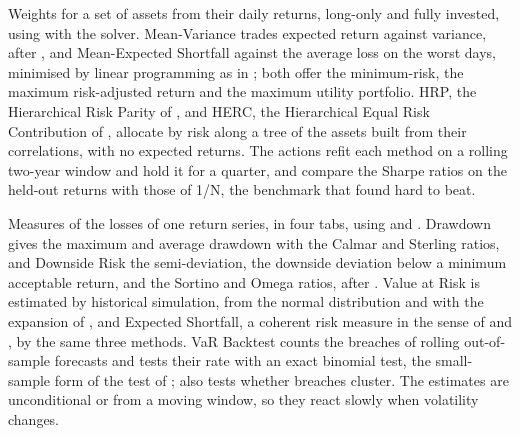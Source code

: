 Weights for a set of assets from their daily returns, long-only and fully invested, using  with the  solver. Mean-Variance trades expected return against variance, after , and Mean-Expected Shortfall against the average loss on the worst days, minimised by linear programming as in ; both offer the minimum-risk, the maximum risk-adjusted return and the maximum utility portfolio. HRP, the Hierarchical Risk Parity of , and HERC, the Hierarchical Equal Risk Contribution of , allocate by risk along a tree of the assets built from their correlations, with no expected returns. The actions refit each method on a rolling two-year window and hold it for a quarter, and compare the Sharpe ratios on the held-out returns with those of 1/N, the benchmark that  found hard to beat.

Measures of the losses of one return series, in four tabs, using  and . Drawdown gives the maximum and average drawdown with the Calmar and Sterling ratios, and Downside Risk the semi-deviation, the downside deviation below a minimum acceptable return, and the Sortino and Omega ratios, after . Value at Risk is estimated by historical simulation, from the normal distribution and with the expansion of , and Expected Shortfall, a coherent risk measure in the sense of  and , by the same three methods. VaR Backtest counts the breaches of rolling out-of-sample forecasts and tests their rate with an exact binomial test, the small-sample form of the test of ;  also tests whether breaches cluster. The estimates are unconditional or from a moving window, so they react slowly when volatility changes.

